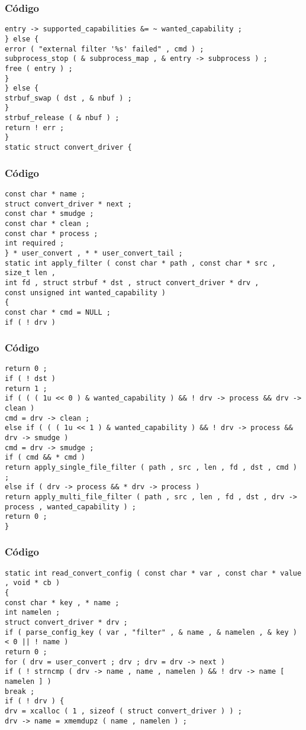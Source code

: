 \documentclass{beamer}
\begin{document}
\begin{frame}[fragile]
\frametitle{C\'odigo}
\begin{verbatim}
entry -> supported_capabilities &= ~ wanted_capability ; 
} else { 
error ( "external filter '%s' failed" , cmd ) ; 
subprocess_stop ( & subprocess_map , & entry -> subprocess ) ; 
free ( entry ) ; 
} 
} else { 
strbuf_swap ( dst , & nbuf ) ; 
} 
strbuf_release ( & nbuf ) ; 
return ! err ; 
} 
static struct convert_driver { 
\end{verbatim}
\end{frame}
\begin{frame}[fragile]
\frametitle{C\'odigo}
\begin{verbatim}
const char * name ; 
struct convert_driver * next ; 
const char * smudge ; 
const char * clean ; 
const char * process ; 
int required ; 
} * user_convert , * * user_convert_tail ; 
static int apply_filter ( const char * path , const char * src , size_t len , 
int fd , struct strbuf * dst , struct convert_driver * drv , 
const unsigned int wanted_capability ) 
{ 
const char * cmd = NULL ; 
if ( ! drv ) 
\end{verbatim}
\end{frame}
\begin{frame}[fragile]
\frametitle{C\'odigo}
\begin{verbatim}
return 0 ; 
if ( ! dst ) 
return 1 ; 
if ( ( ( 1u << 0 ) & wanted_capability ) && ! drv -> process && drv -> clean ) 
cmd = drv -> clean ; 
else if ( ( ( 1u << 1 ) & wanted_capability ) && ! drv -> process && drv -> smudge ) 
cmd = drv -> smudge ; 
if ( cmd && * cmd ) 
return apply_single_file_filter ( path , src , len , fd , dst , cmd ) ; 
else if ( drv -> process && * drv -> process ) 
return apply_multi_file_filter ( path , src , len , fd , dst , drv -> process , wanted_capability ) ; 
return 0 ; 
} 
\end{verbatim}
\end{frame}
\begin{frame}[fragile]
\frametitle{C\'odigo}
\begin{verbatim}
static int read_convert_config ( const char * var , const char * value , void * cb ) 
{ 
const char * key , * name ; 
int namelen ; 
struct convert_driver * drv ; 
if ( parse_config_key ( var , "filter" , & name , & namelen , & key ) < 0 || ! name ) 
return 0 ; 
for ( drv = user_convert ; drv ; drv = drv -> next ) 
if ( ! strncmp ( drv -> name , name , namelen ) && ! drv -> name [ namelen ] ) 
break ; 
if ( ! drv ) { 
drv = xcalloc ( 1 , sizeof ( struct convert_driver ) ) ; 
drv -> name = xmemdupz ( name , namelen ) ; 
\end{verbatim}
\end{frame}
\end{document}
